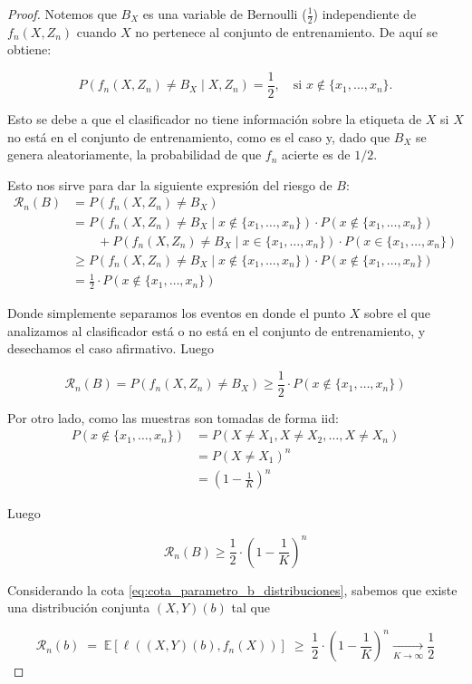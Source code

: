 \documentclass{report}
\begin{document}
\begin{proof}
Notemos que \(B_X\) es una variable de Bernoulli (\(\frac{1}{2}\)) independiente de \(f_n(X, Z_n)\) cuando 
\(X\) no pertenece al conjunto de entrenamiento. De aquí se obtiene:

\[
P(f_n(X, Z_n) \neq B_X \mid X, Z_n) = \frac{1}{2}, \quad \text{si } x \notin \{x_1, \dots, x_n\}.
\]

Esto se debe a que el clasificador no tiene información sobre la etiqueta de \(X\) si \(X\) no está en el conjunto de entrenamiento,
como es el caso y, dado que $B_X$ se genera aleatoriamente, la probabilidad de que $f_n$ acierte es de $1/2$. \newline

Esto nos sirve para
dar la siguiente expresión del riesgo de $B$:\newline
\begin{equation*}
    \begin{aligned}
        \mathcal{R}_n(B) &= P(f_n(X, Z_n) \neq B_X)\\
        &= P(f_n(X, Z_n) \neq B_X \mid x \notin \{x_1, \dots, x_n\}) \cdot P(x \notin \{x_1, \dots, x_n\})\\
        &  \qquad + P(f_n(X, Z_n) \neq B_X \mid x \in \{x_1, \dots, x_n\}) \cdot P(x \in \{x_1, \dots, x_n\})\\
        &\geq P(f_n(X, Z_n) \neq B_X \mid x \notin \{x_1, \dots, x_n\}) \cdot P(x \notin \{x_1, \dots, x_n\})\\
        & = \frac{1}{2} \cdot P(x \notin \{x_1, \dots, x_n\})
    \end{aligned}
\end{equation*}

Donde simplemente separamos los eventos en donde el punto $X$ sobre el que analizamos al clasificador está o no está
en el conjunto de entrenamiento, y desechamos el caso afirmativo. Luego

\[
\mathcal{R}_n(B) = P(f_n(X, Z_n) \neq B_X) \geq \frac{1}{2} \cdot P(x \notin \{x_1, \dots, x_n\})
\]

Por otro lado, como las muestras son tomadas de forma iid:
\[
\begin{aligned}
    P(x \notin \{x_1, \dots, x_n\}) &= P(X\neq X_1, X\neq X_2, \dots, X\neq X_n) \\
   &= P(X\neq X_1)^n \\
   &= \left(1-\frac{1}{K}\right)^n
\end{aligned}
\]

Luego

\[
\mathcal{R}_n(B) \geq \frac{1}{2} \cdot \left(1-\frac{1}{K}\right)^n
\]

Considerando la cota \ref{eq:cota_parametro_b_distribuciones}, sabemos que existe una distribución
conjunta $(X,Y)(b)$ tal que 

\[
\mathcal{R}_n(b) \; =\; \mathbb{E}[\ell((X,Y)(b),f_n(X))] \; \geq \;  \frac{1}{2} \cdot \left(1-\frac{1}{K}\right)^n \xrightarrow[K \to \infty]{} \frac{1}{2}
\]


\end{proof}
\end{document}
